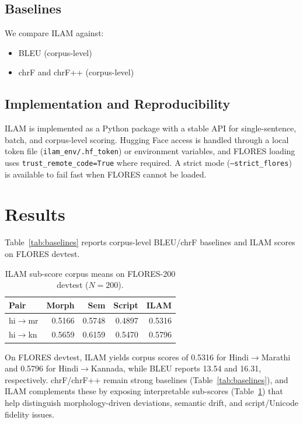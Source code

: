 \documentclass[conference]{IEEEtran}
\begin{document}
\subsection{Baselines}
We compare ILAM against:
\begin{itemize}
  \item BLEU (corpus-level)
  \item chrF and chrF++ (corpus-level)
\end{itemize}

\subsection{Implementation and Reproducibility}
ILAM is implemented as a Python package with a stable API for single-sentence, batch, and corpus-level scoring. Hugging Face access is handled through a local token file (\texttt{ilam\_env/.hf\_token}) or environment variables, and FLORES loading uses \texttt{trust\_remote\_code=True} where required. A strict mode (\texttt{--strict\_flores}) is available to fail fast when FLORES cannot be loaded.

\section{Results}
Table~\ref{tab:baselines} reports corpus-level BLEU/chrF baselines and ILAM scores on FLORES devtest.

\begin{table}[t]
\centering
\caption{ILAM sub-score corpus means on FLORES-200 devtest ($N=200$).}
\label{tab:subs}
\begin{tabular}{lrrrr}
\toprule
Pair & Morph & Sem & Script & ILAM \\
\midrule
hi$\rightarrow$mr & 0.5166 & 0.5748 & 0.4897 & 0.5316 \\
hi$\rightarrow$kn & 0.5659 & 0.6159 & 0.5470 & 0.5796 \\
\bottomrule
\end{tabular}
\end{table}

On FLORES devtest, ILAM yields corpus scores of 0.5316 for Hindi$\rightarrow$Marathi and 0.5796 for Hindi$\rightarrow$Kannada, while BLEU reports 13.54 and 16.31, respectively. chrF/chrF++ remain strong baselines (Table~\ref{tab:baselines}), and ILAM complements these by exposing interpretable sub-scores (Table~\ref{tab:subs}) that help distinguish morphology-driven deviations, semantic drift, and script/Unicode fidelity issues.
\end{document}
